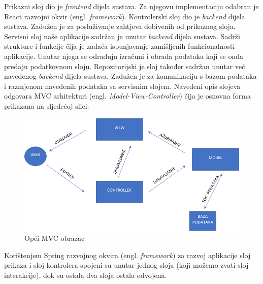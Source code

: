 	\noindent Prikazni sloj dio je \textit{frontend} dijela sustava. Za njegovu implementaciju odabran je React razvojni okvir (engl. \textit{framework}). \newline
	Kontrolerski sloj dio je \textit{backend} dijela sustava. Zadužen je za posluživanje zahtjeva dobivenih od prikaznog sloja.
	\newline\newline
	Servisni sloj naše aplikacije sadržan je unutar \textit{backend} dijela sustava. Sadrži strukture i funkcije čija je zadaća ispunjavanje zamišljenih funkcionalnosti aplikacije. Unutar njega se odrađuju izračuni i obrada podataka koji se onda predaju podatkovnom sloju. \newline\newline
	Repozitorijski je sloj također sadržan unutar već navedenog \textit{backend} dijela sustava. Zadužen je za komunikaciju s bazom podataka i razmjenom navedenih podataka sa servisnim slojem.
	\newline\newline
	Navedeni opis slojeva odgovara MVC arhitekturi (engl. \textit{Model-View-Controller}) čija je osnovna forma prikazana na sljedećoj slici. \newline
	\begin{figure}[H]
		\includegraphics[scale=0.6]{./Slike/mvc-opce.png}
		\centering
		\caption{Opći MVC obrazac}
		\label{fig:promjene}
	\end{figure}
	\noindent Korištenjem Spring razvojnog okvira (engl. \textit{framework}) za razvoj aplikacije sloj prikaza i sloj kontrolera spojeni su unutar jednog sloja (koji možemo zvati sloj interakcije), dok su ostala dva sloja ostala odvojena. 
